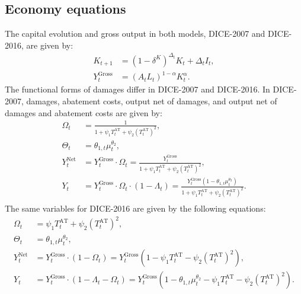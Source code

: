 \documentclass[11pt, a4paper, pdftex, twoside, dvipsnames]{article}
\begin{document}
\begin{appendices}
\subsection{Economy equations}
\label{sec:economy}
The capital evolution and gross output in both models, DICE-2007 and DICE-2016, are given by:
\begin{align}
\label{eq:capital_appendix}
    K_{t+1} &= (1-\delta^K)^{\Delta_t} K_t + \Delta_t I_t,\\
    \label{eq:grossoutput_appendix}
    Y^{\text{Gross}}_t &= (A_t L_t)^{1-\alpha} K_t^{\alpha}.
\end{align}
The functional forms of damages differ in DICE-2007 and DICE-2016. In DICE-2007, damages, abatement costs, output net of damages, and output net of damages and abatement costs  are given by:
\begin{align}
 \label{eq:damages2007_appendix}   \Omega_t &= \frac{1}{1 + \psi_1 T^{\text{AT}}_{t} + \psi_2 (T^{\text{AT}}_{t})^2}, \\
  \label{eq:abatcost2007_appendix}  \Theta_{t} &= \theta_{1,t} \mu_t ^ {\theta_2},\\
   \label{eq:netout2007_appendix} Y^{\text{Net}}_t &= Y^{\text{Gross}}_t \cdot \Omega_t =  \frac{Y^{\text{Gross}}_t}{1 + \psi_1 T^{\text{AT}}_{t} + \psi_2 (T^{\text{AT}}_{t})^2} ,\\
   \label{eq:output2007_appendix} Y_t &= Y^{\text{Gross}}_t \cdot \Omega_t \cdot (1-\Lambda_t) = \frac{Y^{\text{Gross}}_t (1-  \theta_{1,t} \mu_t ^ {\theta_2})}{1 + \psi_1 T^{\text{AT}}_{t} + \psi_2 (T^{\text{AT}}_{t})^2}.\\
\end{align}
The same variables for DICE-2016 are given by the following equations:
\begin{align}
    \label{eq:damages2016_appendix} \Omega_t &=  \psi_1 T^{\text{AT}}_{t} + \psi_2 (T^{\text{AT}}_{t})^2 ,\\
    \label{eq:abatcost2016_appendix} \Theta_{t} &= \theta_{1,t} \mu_t ^ {\theta_2},\\
    \label{eq:netout2016_appendix} Y^{\text{Net}}_t &= Y^{\text{Gross}}_t \cdot (1- \Omega_t )=  Y^{\text{Gross}}_t (1 - \psi_1 T^{\text{AT}}_{t} - \psi_2 (T^{\text{AT}}_{t})^2),  \\
    \label{eq:output2016_appendix} Y_t &= Y^{\text{Gross}}_t  \cdot (1-\Lambda_t - \Omega_t) = Y^{\text{Gross}}_t (1-  \theta_{1,t} \mu_t ^ {\theta_2} - \psi_1 T^{\text{AT}}_{t} - \psi_2 (T^{\text{AT}}_{t})^2).\\

\end{align}
\end{appendices}
\end{document}

